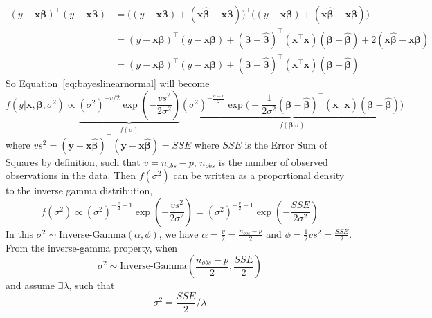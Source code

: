 \begin{align} 
    (y-\mathbf{x}\boldsymbol{\beta})^{\top}(y-\mathbf{x}\boldsymbol{\beta})&=\big ((y-\mathbf{x}\boldsymbol{\beta})+(\mathbf{x}\hat{\boldsymbol{\beta}}-\mathbf{x}\boldsymbol{\beta})\big )^{\top}\big ((y-\mathbf{x}\boldsymbol{\beta})+(\mathbf{x}\hat{\boldsymbol{\beta}}-\mathbf{x}\boldsymbol{\beta})\big )\\
    &=(y-\mathbf{x}\boldsymbol{\beta})^{\top}(y-\mathbf{x}\boldsymbol{\beta}) + (\boldsymbol{\beta}-\hat{\boldsymbol{\beta}})^{\top}(\mathbf{x}^{\top}\mathbf{x})(\boldsymbol{\beta}-\hat{\boldsymbol{\beta}})+2(\mathbf{x}\hat{\boldsymbol{\beta}}-\mathbf{x}\boldsymbol{\beta})\\
    &=(y-\mathbf{x}\boldsymbol{\beta})^{\top}(y-\mathbf{x}\boldsymbol{\beta}) + (\boldsymbol{\beta}-\hat{\boldsymbol{\beta}})^{\top}(\mathbf{x}^{\top}\mathbf{x})(\boldsymbol{\beta}-\hat{\boldsymbol{\beta}})
\end{align}
So Equation~\ref{eq:bayeslinearnormal} will become 
\begin{equation} 
    f(y|\mathbf{x}, \boldsymbol{\beta}, \sigma^2)\propto \underbrace{(\sigma^2)^{-v/2}\exp (-\frac{vs^2}{2\sigma^2})}_{f(\sigma)}\underbrace{(\sigma^2)^{-\frac{n-v}{2}}\exp \Big (-\frac{1}{2\sigma^2}(\boldsymbol{\beta}-\hat{\boldsymbol{\beta}})^{\top}(\mathbf{x}^{\top}\mathbf{x})(\boldsymbol{\beta}-\hat{\boldsymbol{\beta}})\Big )}_{f(\boldsymbol{\beta}|\sigma)}
\end{equation}
where $vs^2=(\mathbf{y}-\mathbf{x}\hat{\boldsymbol{\beta}})^{\top}(\mathbf{y}-\mathbf{x}\hat{\boldsymbol{\beta}})=SSE$ where $SSE$ is the Error Sum of Squares by definition, such that $v=n_{obs}-p$, $n_{obs}$ is the number of observed observations in the data. 
Then $f(\sigma^2)$ can be written as a proportional density to the inverse gamma distribution,
\begin{equation} 
    f(\sigma^2)\propto (\sigma^2)^{-\frac{v}{2}-1}\exp (-\frac{vs^2}{2\sigma^2})=(\sigma^2)^{-\frac{v}{2}-1}\exp (-\frac{SSE}{2\sigma^2})
\end{equation}
In this $\sigma^2\sim \text{Inverse-Gamma}(\alpha, \phi)$, we have $\alpha = \frac{v}{2}=\frac{n_{obs}-p}{2}$ and $\phi = \frac{1}{2}vs^2=\frac{SSE}{2}$.
From the inverse-gamma property, when 
\begin{equation} 
    \sigma^2\sim \text{Inverse-Gamma}(\frac{n_{obs}-p}{2}, \frac{SSE}{2})
\end{equation}
and assume $\exists\lambda$, such that 
\begin{equation} 
    \sigma^2=\frac{SSE}{2}/\lambda
\end{equation}
